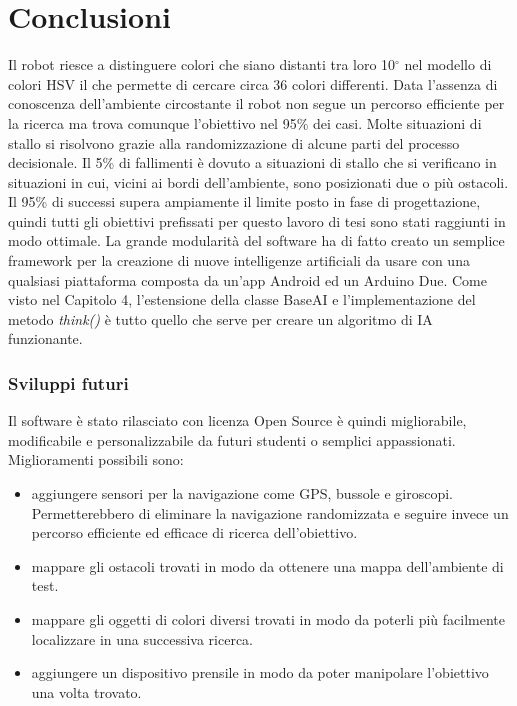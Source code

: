 \chapter*{Conclusioni}
\fancyfoot[C]{\thepage}
Il robot riesce 
a distinguere colori che siano distanti tra loro 10$^\circ$ nel modello di colori HSV
il che permette di cercare circa 36 colori differenti. Data l'assenza di conoscenza 
dell'ambiente circostante il robot non segue un percorso efficiente per la ricerca ma trova comunque l'obiettivo
nel 95\% dei casi. Molte situazioni di stallo si risolvono grazie alla randomizzazione 
di alcune parti del processo decisionale. Il 5\% di fallimenti è dovuto a situazioni di stallo 
che si verificano in situazioni in cui, vicini ai bordi dell'ambiente, sono posizionati 
due o più ostacoli. Il 95\% di successi supera ampiamente il limite posto in fase di progettazione, 
quindi tutti gli obiettivi prefissati per questo lavoro di tesi sono stati raggiunti in modo
ottimale.
La grande modularità del software ha di fatto creato un semplice framework per 
la creazione di nuove intelligenze artificiali da usare con una qualsiasi piattaforma
composta da un'app Android ed un Arduino Due. Come visto nel Capitolo 4, l'estensione della
classe BaseAI e l'implementazione del metodo \emph{think()} è tutto quello che serve per
creare un algoritmo di IA funzionante.
\subsection* {Sviluppi futuri}
Il software è stato rilasciato con licenza Open Source è quindi migliorabile, 
modificabile e personalizzabile da futuri studenti o semplici appassionati.
Miglioramenti possibili sono:
\begin{itemize}
\item aggiungere sensori per la navigazione come GPS, 
bussole e giroscopi. Permetterebbero di eliminare la navigazione randomizzata e seguire invece un percorso efficiente ed efficace
di ricerca dell'obiettivo.
\item mappare gli ostacoli trovati in modo da ottenere una mappa dell'ambiente di test.
\item mappare gli oggetti di colori diversi trovati in modo da poterli più facilmente localizzare 
in una successiva ricerca.
\item aggiungere un dispositivo prensile in modo da poter manipolare l'obiettivo una volta trovato.
\end{itemize}


